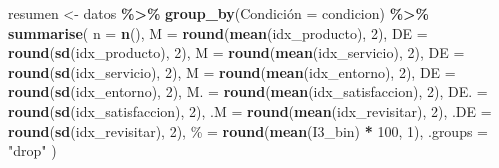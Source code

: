 \documentclass[
  spanish,
]{article}
\newenvironment{Shaded}{\begin{snugshade}}{\end{snugshade}}
\newcommand{\AttributeTok}[1]{\textcolor[rgb]{0.13,0.29,0.53}{#1}}
\newcommand{\DecValTok}[1]{\textcolor[rgb]{0.00,0.00,0.81}{#1}}
\newcommand{\FunctionTok}[1]{\textcolor[rgb]{0.13,0.29,0.53}{\textbf{#1}}}
\newcommand{\NormalTok}[1]{#1}
\newcommand{\OtherTok}[1]{\textcolor[rgb]{0.56,0.35,0.01}{#1}}
\newcommand{\SpecialCharTok}[1]{\textcolor[rgb]{0.81,0.36,0.00}{\textbf{#1}}}
\newcommand{\StringTok}[1]{\textcolor[rgb]{0.31,0.60,0.02}{#1}}
\begin{document}
\begin{Shaded}
\begin{Highlighting}[]
\NormalTok{resumen }\OtherTok{\textless{}{-}}\NormalTok{ datos }\SpecialCharTok{\%\textgreater{}\%}
  \FunctionTok{group\_by}\NormalTok{(}\StringTok{\textasciigrave{}}\AttributeTok{Condición}\StringTok{\textasciigrave{}} \OtherTok{=}\NormalTok{ condicion) }\SpecialCharTok{\%\textgreater{}\%}
  \FunctionTok{summarise}\NormalTok{(}
    \AttributeTok{n    =} \FunctionTok{n}\NormalTok{(),}
    \StringTok{\textasciigrave{}}\AttributeTok{M}\StringTok{\textasciigrave{}}   \OtherTok{=} \FunctionTok{round}\NormalTok{(}\FunctionTok{mean}\NormalTok{(idx\_producto), }\DecValTok{2}\NormalTok{),}
    \StringTok{\textasciigrave{}}\AttributeTok{DE}\StringTok{\textasciigrave{}}  \OtherTok{=} \FunctionTok{round}\NormalTok{(}\FunctionTok{sd}\NormalTok{(idx\_producto), }\DecValTok{2}\NormalTok{),}
    \StringTok{\textasciigrave{}}\AttributeTok{M }\StringTok{\textasciigrave{}}  \OtherTok{=} \FunctionTok{round}\NormalTok{(}\FunctionTok{mean}\NormalTok{(idx\_servicio), }\DecValTok{2}\NormalTok{),}
    \StringTok{\textasciigrave{}}\AttributeTok{DE }\StringTok{\textasciigrave{}} \OtherTok{=} \FunctionTok{round}\NormalTok{(}\FunctionTok{sd}\NormalTok{(idx\_servicio), }\DecValTok{2}\NormalTok{),}
    \StringTok{\textasciigrave{}}\AttributeTok{ M}\StringTok{\textasciigrave{}}  \OtherTok{=} \FunctionTok{round}\NormalTok{(}\FunctionTok{mean}\NormalTok{(idx\_entorno), }\DecValTok{2}\NormalTok{),}
    \StringTok{\textasciigrave{}}\AttributeTok{ DE}\StringTok{\textasciigrave{}} \OtherTok{=} \FunctionTok{round}\NormalTok{(}\FunctionTok{sd}\NormalTok{(idx\_entorno), }\DecValTok{2}\NormalTok{),}
    \StringTok{\textasciigrave{}}\AttributeTok{M.}\StringTok{\textasciigrave{}}    \OtherTok{=} \FunctionTok{round}\NormalTok{(}\FunctionTok{mean}\NormalTok{(idx\_satisfaccion), }\DecValTok{2}\NormalTok{),}
    \StringTok{\textasciigrave{}}\AttributeTok{DE.}\StringTok{\textasciigrave{}}   \OtherTok{=} \FunctionTok{round}\NormalTok{(}\FunctionTok{sd}\NormalTok{(idx\_satisfaccion), }\DecValTok{2}\NormalTok{),}
    \StringTok{\textasciigrave{}}\AttributeTok{.M}\StringTok{\textasciigrave{}}    \OtherTok{=} \FunctionTok{round}\NormalTok{(}\FunctionTok{mean}\NormalTok{(idx\_revisitar), }\DecValTok{2}\NormalTok{),}
    \StringTok{\textasciigrave{}}\AttributeTok{.DE}\StringTok{\textasciigrave{}}   \OtherTok{=} \FunctionTok{round}\NormalTok{(}\FunctionTok{sd}\NormalTok{(idx\_revisitar), }\DecValTok{2}\NormalTok{),}
    \StringTok{\textasciigrave{}}\AttributeTok{\%}\StringTok{\textasciigrave{}}     \OtherTok{=} \FunctionTok{round}\NormalTok{(}\FunctionTok{mean}\NormalTok{(I3\_bin) }\SpecialCharTok{*} \DecValTok{100}\NormalTok{, }\DecValTok{1}\NormalTok{),}
    \AttributeTok{.groups =} \StringTok{"drop"}
\NormalTok{  )}
\end{Highlighting}
\end{Shaded}
\end{document}
